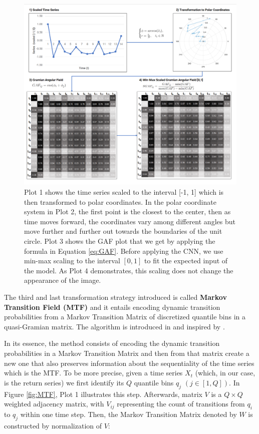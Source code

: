 \documentclass[12pt, a4paper]{article}
\begin{document}
\begin{figure}[!htb]
    \centering
    \includegraphics[width=\textwidth]{images/GAF.png}
    \caption{Plot 1 shows the time series scaled to the interval [-1, 1] which is then transformed to polar coordinates. In the polar coordinate system in Plot 2, the first point is the closest to the center, then as time moves forward, the coordinates vary among different angles but move further and further out towards the boundaries of the unit circle. Plot 3 shows the GAF plot that we get by applying the formula in Equation \ref{eq:GAF}. Before applying the CNN, we use min-max scaling to the interval $[0,1]$ to fit the expected input of the model. As Plot 4 demonstrates, this scaling does not change the appearance of the image.}
    \label{fig:GAF}
\end{figure}

The third and last transformation strategy introduced is called \textbf{Markov Transition Field (MTF)} and it entails encoding dynamic transition probabilities from a Markov Transition Matrix of discretized quantile bins in a quasi-Gramian matrix. The algorithm is introduced in \cite{wang2015encoding} and inspired by \cite{campanharo2011duality}.

In its essence, the method consists of encoding the dynamic transition probabilities in a Markov Transition Matrix and then from that matrix create a new one that also preserves information about the sequentiality of the time series which is the MTF.
To be more precise, given a time series $X_t$ (which, in our case, is the return series) we first identify its $Q$ quantile bins $q_j$ $(j \in [1,Q])$. In Figure \ref{fig:MTF}, Plot 1 illustrates this step. Afterwards, matrix $V$ is a $Q \times Q$ weighted adjacency matrix, with $V_{ij}$ representing the count of transitions from $q_i$ to $q_j$ within one time step. 
Then, the Markov Transition Matrix denoted by $W$ is constructed by normalization of $V$:
\end{document}
